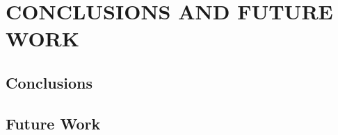\chapter{CONCLUSIONS AND FUTURE WORK}
\label{chap:conclusions}

\section{Conclusions}

\section{Future Work}
